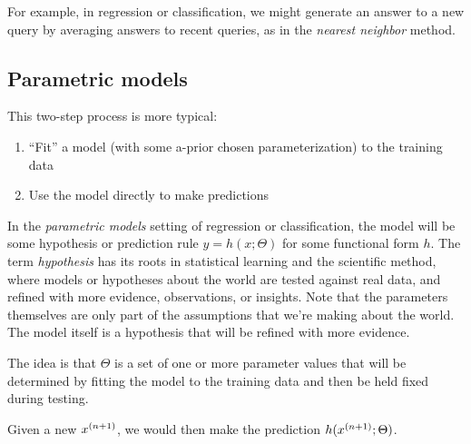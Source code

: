 For example, in regression or classification, we might generate an answer to a new query by averaging answers to recent queries, as in the {\em nearest neighbor} method.


\subsection{Parametric models}

This two-step process is more typical:
\begin{enumerate}
  \item ``Fit'' a model (with some a-prior chosen parameterization) to the training data
  \item Use the model directly to make predictions
\end{enumerate}

In the {\em parametric models} setting of regression or classification, the
model will be some hypothesis or prediction rule $y = h(x ; \Theta)$ for some functional form $h$. The term {\em hypothesis} has its roots in statistical learning and the scientific method, where models or hypotheses about the world are tested against real data, and refined with more evidence, observations, or insights. Note that the parameters themselves are only part of the assumptions that we're making about the world. The model itself is a hypothesis that will be refined with more evidence. 

The idea is that $\Theta$ is a set
of one or more parameter values that will be determined by fitting the
model to the training data and then be held fixed during testing.  

Given a new $x^{(n+1)}$, we would then make the prediction $h(x^{(n+1)};
  \Theta)$.

